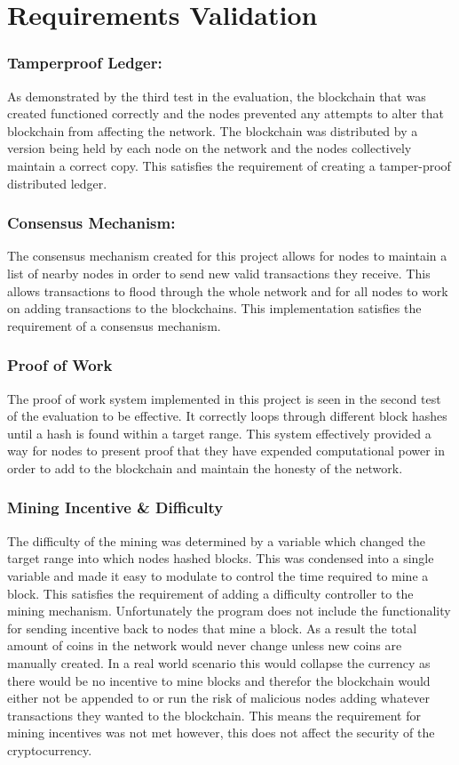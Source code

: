 \documentclass{l4proj}
\begin{document}
\section{Requirements Validation}

\subsubsection{Tamperproof Ledger:}
As demonstrated by the third test in the evaluation, the blockchain that was created functioned correctly and the nodes
prevented any attempts to alter that blockchain from affecting the network. The blockchain was distributed by a version
being held by each node on the network and the nodes collectively maintain a correct copy. This satisfies the requirement of creating a
tamper-proof distributed ledger.
\subsubsection{Consensus Mechanism:}
The consensus mechanism created for this project allows for nodes to maintain a list of nearby nodes in order to send
new valid transactions they receive. This allows transactions to flood through the whole network and for all nodes to
work on adding transactions to the blockchains. This implementation satisfies the requirement of a consensus mechanism.
\subsubsection{Proof of Work}
The proof of work system implemented in this project is seen in the second test of the evaluation to be effective. It
correctly loops through different block hashes until a hash is found within a target range. This system effectively provided a way for nodes to present
proof that they have expended computational power in order to add to the blockchain and maintain the honesty of the 
network.
\subsubsection{Mining Incentive \& Difficulty}
The difficulty of the mining was determined by a variable which changed the target range into which nodes hashed
blocks. This was condensed into a single variable and made it easy to modulate to control the time required to 
mine a block. This satisfies the requirement of adding a difficulty controller to the mining mechanism. Unfortunately
the program does not include the functionality for sending incentive back to nodes that mine a block. As a result the
total amount of coins in the network would never change unless new coins are manually created. In a real world scenario
this would collapse the currency as there would be no incentive to mine blocks and therefor the blockchain would either
not be appended to or run the risk of malicious nodes adding whatever transactions they wanted to the blockchain. This
means the requirement for mining incentives was not met however, this does not affect the security of the cryptocurrency.
\end{document}
